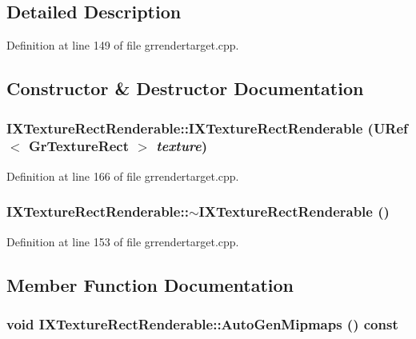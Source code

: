 \subsection{Detailed Description}


Definition at line 149 of file grrendertarget.cpp.

\subsection{Constructor \& Destructor Documentation}
\hypertarget{class_i_x_texture_rect_renderable_7392e5323e2e1ef5c3eaebe473136ffe}{
\subsubsection[{IXTextureRectRenderable}]{\setlength{\rightskip}{0pt plus 5cm}IXTextureRectRenderable::IXTextureRectRenderable ({\bf URef}$<$ {\bf GrTextureRect} $>$ {\em texture})}}
\label{class_i_x_texture_rect_renderable_7392e5323e2e1ef5c3eaebe473136ffe}




Definition at line 166 of file grrendertarget.cpp.\hypertarget{class_i_x_texture_rect_renderable_8b6f70bd5ca981daf3109d9994421fd8}{
\subsubsection[{$\sim$IXTextureRectRenderable}]{\setlength{\rightskip}{0pt plus 5cm}IXTextureRectRenderable::$\sim$IXTextureRectRenderable ()}}
\label{class_i_x_texture_rect_renderable_8b6f70bd5ca981daf3109d9994421fd8}




Definition at line 153 of file grrendertarget.cpp.

\subsection{Member Function Documentation}
\hypertarget{class_i_x_texture_rect_renderable_3f97d83058590ba5fc2f5f213931fcf1}{
\subsubsection[{AutoGenMipmaps}]{\setlength{\rightskip}{0pt plus 5cm}void IXTextureRectRenderable::AutoGenMipmaps () const}}
\label{class_i_x_texture_rect_renderable_3f97d83058590ba5fc2f5f213931fcf1}




